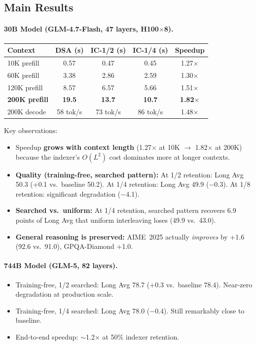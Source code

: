\documentclass[11pt]{article}
\begin{document}
\subsection{Main Results}

\paragraph{30B Model (GLM-4.7-Flash, 47 layers, H100$\times$8).}

\begin{table}[h]
\centering
\small
\begin{tabular}{lcccc}
\toprule
\textbf{Context} & \textbf{DSA (s)} & \textbf{IC-1/2 (s)} & \textbf{IC-1/4 (s)} & \textbf{Speedup} \\
\midrule
10K prefill & 0.57 & 0.47 & 0.45 & 1.27$\times$ \\
60K prefill & 3.38 & 2.86 & 2.59 & 1.30$\times$ \\
120K prefill & 8.57 & 6.57 & 5.66 & 1.51$\times$ \\
\textbf{200K prefill} & \textbf{19.5} & \textbf{13.7} & \textbf{10.7} & \textbf{1.82$\times$} \\
200K decode & 58 tok/s & 73 tok/s & 86 tok/s & 1.48$\times$ \\
\bottomrule
\end{tabular}
\end{table}

\noindent Key observations:
\begin{itemize}
    \item Speedup \textbf{grows with context length} (1.27$\times$ at 10K $\to$ 1.82$\times$ at 200K) because the indexer's $O(L^2)$ cost dominates more at longer contexts.
    \item \textbf{Quality (training-free, searched pattern):} At 1/2 retention: Long Avg 50.3 (+0.1 vs.\ baseline 50.2). At 1/4 retention: Long Avg 49.9 ($-$0.3). At 1/8 retention: significant degradation ($-$4.1).
    \item \textbf{Searched vs.\ uniform:} At 1/4 retention, searched pattern recovers 6.9 points of Long Avg that uniform interleaving loses (49.9 vs.\ 43.0).
    \item \textbf{General reasoning is preserved:} AIME~2025 actually \emph{improves} by +1.6 (92.6 vs.\ 91.0), GPQA-Diamond +1.0.
\end{itemize}

\paragraph{744B Model (GLM-5, 82 layers).}
\begin{itemize}
    \item Training-free, 1/2 searched: Long Avg 78.7 (+0.3 vs.\ baseline 78.4). Near-zero degradation at production scale.
    \item Training-free, 1/4 searched: Long Avg 78.0 ($-$0.4). Still remarkably close to baseline.
    \item End-to-end speedup: ${\sim}$1.2$\times$ at 50\% indexer retention.
\end{itemize}
\end{document}
